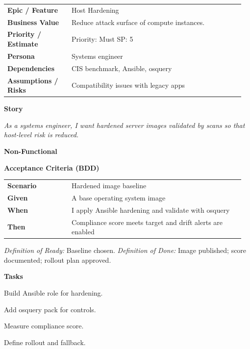 \documentclass[11pt,letterpaper]{article}
\makeatletter
\newenvironment{kvtable}{%
  \par\noindent\begin{tabular}{@{}>{\raggedright\bfseries\arraybackslash}p{0.26\linewidth} >{\raggedright\arraybackslash}p{0.70\linewidth}@{}}
}{\end{tabular}\par}
\newenvironment{bdd}{%
  \par\noindent\begin{tabular}{@{}>{\raggedright\bfseries\arraybackslash}p{0.26\linewidth} >{\raggedright\arraybackslash}p{0.70\linewidth}@{}}
}{\end{tabular}\par}
\newcommand{\DoRDoD}[2]{%
  \vspace{0.35em}
  {\footnotesize\color{Muted}%
    \textit{Definition of Ready:} #1 \; \textbullet\;
    \textit{Definition of Done:} #2%
  }%
}
\newenvironment{storycard}[2]{%
  \begin{tcolorbox}[cloudcard, title={#1 --- #2}]%
}{\end{tcolorbox}}
\newcommand{\sectionlabel}[1]{\par\vspace{0.35em}\textbf{#1}\par}
\makeatother
\begin{document}
\begin{storycard}{CCS-17}{Ch. 17 — Locking Down Cloud Servers}
\begin{kvtable}
Epic / Feature & Host Hardening\\
Business Value & Reduce attack surface of compute instances.\\
Priority / Estimate & Priority: Must \quad SP: 5\\
Persona & Systems engineer\\
Dependencies & CIS benchmark, Ansible, osquery\\
Assumptions / Risks & Compatibility issues with legacy apps\\
\end{kvtable}
\sectionlabel{Story}
\textit{As a systems engineer, I want hardened server images validated by scans so that host-level risk is reduced.}
\sectionlabel{Non-Functional}\;
\sectionlabel{Acceptance Criteria (BDD)}
\begin{bdd}
Scenario & Hardened image baseline\\
Given & A base operating system image\\
When & I apply Ansible hardening and validate with osquery\\
Then & Compliance score meets target and drift alerts are enabled\\
\end{bdd}
\DoRDoD{Baseline chosen.}{Image published; score documented; rollout plan approved.}
\sectionlabel{Tasks}
\begin{checklist}
\item Build Ansible role for hardening.
\item Add osquery pack for controls.
\item Measure compliance score.
\item Define rollout and fallback.
\end{checklist}
\end{storycard}
\end{document}
